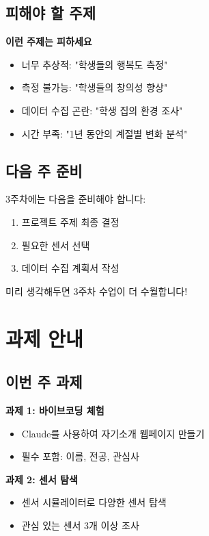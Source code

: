 \documentclass[11pt, a4paper]{article}
\begin{document}
\subsection{피해야 할 주제}

\begin{warning}
\textbf{이런 주제는 피하세요}
\begin{itemize}
  \item 너무 추상적: "학생들의 행복도 측정"
  \item 측정 불가능: "학생들의 창의성 향상"
  \item 데이터 수집 곤란: "학생 집의 환경 조사"
  \item 시간 부족: "1년 동안의 계절별 변화 분석"
\end{itemize}
\end{warning}

\subsection{다음 주 준비}

3주차에는 다음을 준비해야 합니다:
\begin{enumerate}
  \item 프로젝트 주제 최종 결정
  \item 필요한 센서 선택
  \item 데이터 수집 계획서 작성
\end{enumerate}

미리 생각해두면 3주차 수업이 더 수월합니다!

\newpage

\section{과제 안내}

\subsection{이번 주 과제}

\begin{tcolorbox}[enhanced, colback=blue!5, colframe=NavyBlue, 
                  title={\Large\textbf{2주차 과제}}, fonttitle=\bfseries]

\textbf{과제 1: 바이브코딩 체험}
\begin{itemize}
  \item Claude를 사용하여 자기소개 웹페이지 만들기
  \item 필수 포함: 이름, 전공, 관심사
\end{itemize}

\vspace{0.5em}

\textbf{과제 2: 센서 탐색}
\begin{itemize}
  \item 센서 시뮬레이터로 다양한 센서 탐색
  \item 관심 있는 센서 3개 이상 조사
\end{itemize}

\end{tcolorbox}
\end{document}
